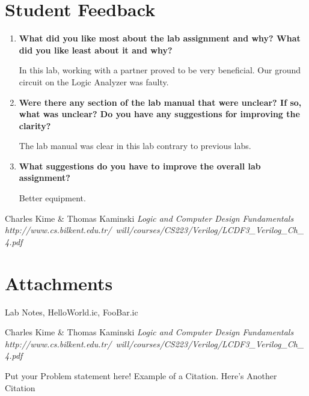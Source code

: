 \documentclass[a4paper,12pt]{article}
\begin{document}
\section*{Student Feedback}

\begin{enumerate}
  \item \textbf{What did you like most about the lab assignment and why? What did you like least about it and why?}
  
  In this lab, working with a partner proved to be very beneficial. Our ground circuit on the Logic Analyzer was faulty.

  \item \textbf{Were there any section of the lab manual that were unclear? If so, what was unclear? Do you have any suggestions for improving the clarity?}

  The lab manual was clear in this lab contrary to previous labs.

  \item \textbf{What suggestions do you have to improve the overall lab assignment?}
  
  Better equipment.

\end{enumerate}

\ifx
\begin{thebibliography}{1}
 Charles Kime \& Thomas Kaminski  \emph{Logic and Computer Design Fundamentals} \\ \hspace{15pt}\textit{http://www.cs.bilkent.edu.tr/~will/courses/CS223/Verilog/LCDF3_Verilog_Ch_4.pdf}
\end{thebibliography}

\section*{Attachments}
Lab Notes, HelloWorld.ic, FooBar.ic

\begin{thebibliography}{9}
 Charles Kime & Thomas Kaminski  \emph{Logic and Computer Design Fundamentals} \textit{http://www.cs.bilkent.edu.tr/~will/courses/CS223/Verilog/LCDF3_Verilog_Ch_4.pdf}
\end{thebibliography}

Put your Problem statement here! Example of a Citation\cite[p.219]{Robotics}. Here's Another Citation\cite{Flueck}
\fi
\end{document}
